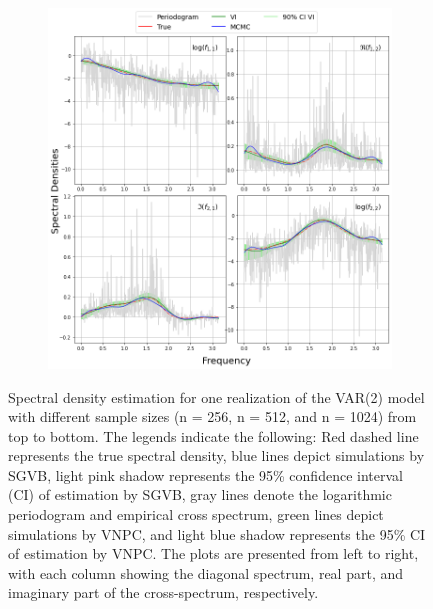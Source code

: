\documentclass[12pt,a4paper]{article}
\begin{document}
\begin{figure}[H]
\begin{subfigure}{\textwidth} %
  \centering
  \includegraphics[width=18cm]{VAR(2) with length 1024 by variational inference and VNPC.png}
\end{subfigure}
\caption{Spectral density estimation for one realization of the VAR(2) model with different sample sizes (n = 256, n = 512, and n = 1024) from top to bottom. The legends indicate the following: Red dashed line represents the true spectral density, blue lines depict simulations by SGVB, light pink shadow represents the 95\% confidence interval (CI) of estimation by SGVB, gray lines denote the logarithmic periodogram and empirical cross spectrum, green lines depict simulations by VNPC, and light blue shadow represents the 95\% CI of estimation by VNPC. The plots are presented from left to right, with each column showing the diagonal spectrum, real part, and imaginary part of the cross-spectrum, respectively.}
\label{var2 plots}
\end{figure}
\end{document}
